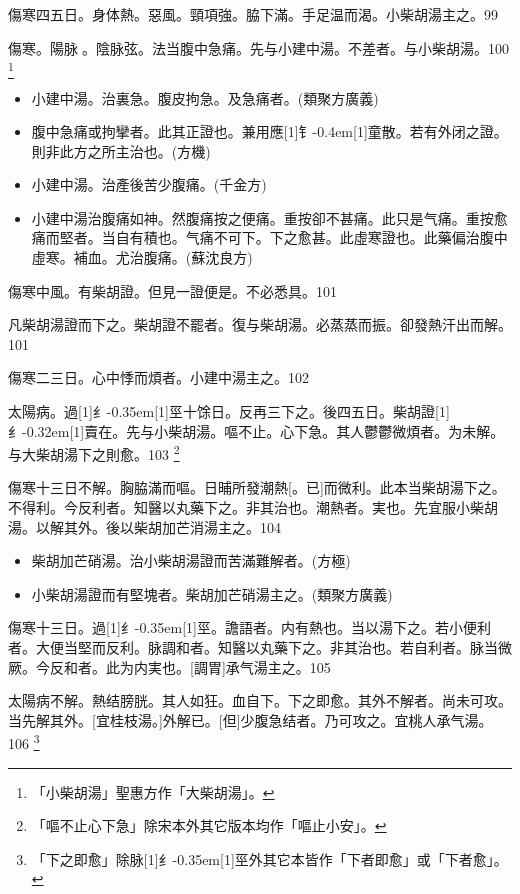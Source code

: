 \documentclass[11pt,oneside,b5paper]{ctexbook}
\begin{document}
\begin{flushleft}
傷寒四五日。身体熱。惡風。頸項強。脇下滿。手足温而渴。小柴胡湯主之。99

傷寒。陽脉{𬈧}。陰脉弦。法当腹中急痛。先与小建中湯。不差者。与小柴胡湯。100
\footnote{「小柴胡湯」聖惠方作「大柴胡湯」。}

\begin{itemize}
\item 小建中湯。治裏急。腹皮拘急。及急痛者。(類聚方廣義)
\item 腹中急痛或拘攣者。此其正證也。兼用應{\hbox{\scalebox{0.7}[1]{钅}\kern-0.4em\scalebox{0.7}[1]{童}}}散。若有外闭之證。則非此方之所主治也。(方機)
\item 小建中湯。治產後苦少腹痛。(千金方)
\item 小建中湯治腹痛如神。然腹痛按之便痛。重按卻不甚痛。此只是气痛。重按愈痛而堅者。当自有積也。气痛不可下。下之愈甚。此虛寒證也。此藥偏治腹中虛寒。補血。尤治腹痛。(蘇沈良方)
\end{itemize}

傷寒中風。有柴胡證。但見一證便是。不必悉具。101

凡柴胡湯證而下之。柴胡證不罷者。復与柴胡湯。必蒸蒸而振。卻發熱汗出而解。101

傷寒二三日。心中悸而煩者。小建中湯主之。102

太陽病。過{\hbox{\scalebox{0.68}[1]{纟}\kern-0.35em\scalebox{0.64}[1]{巠}}}十馀日。反再三下之。後四五日。柴胡證{\hbox{\scalebox{0.6}[1]{纟}\kern-0.32em\scalebox{0.7}[1]{賣}}}在。先与小柴胡湯。嘔不止。心下急。其人鬱鬱微煩者。为未解。与大柴胡湯下之則愈。103
\footnote{「嘔不止心下急」除宋本外其它版本均作「嘔止小安」。}

傷寒十三日不解。胸脇滿而嘔。日晡所發潮熱[。已]而微利。此本当柴胡湯下之。不得利。今反利者。知醫以丸藥下之。非其治也。潮熱者。実也。先宜服小柴胡湯。以解其外。後以柴胡加芒消湯主之。104

\begin{itemize}
\item 柴胡加芒硝湯。治小柴胡湯證而苦滿難解者。(方極)
\item 小柴胡湯證而有堅塊者。柴胡加芒硝湯主之。(類聚方廣義)
\end{itemize}

傷寒十三日。過{\hbox{\scalebox{0.68}[1]{纟}\kern-0.35em\scalebox{0.64}[1]{巠}}}。譫語者。内有熱也。当以湯下之。若小便利者。大便当堅而反利。脉調和者。知醫以丸藥下之。非其治也。若自利者。脉当微厥。今反和者。此为内実也。[調胃]承气湯主之。105

太陽病不解。熱结膀胱。其人如狂。血自下。下之即愈。其外不解者。尚未可攻。当先解其外。[宜桂枝湯。]外解已。[但]少腹急结者。乃可攻之。宜桃人承气湯。106
\footnote{「下之即愈」除脉{\hbox{\scalebox{0.68}[1]{纟}\kern-0.35em\scalebox{0.64}[1]{巠}}}外其它本皆作「下者即愈」或「下者愈」。}


\end{flushleft}
\end{document}
